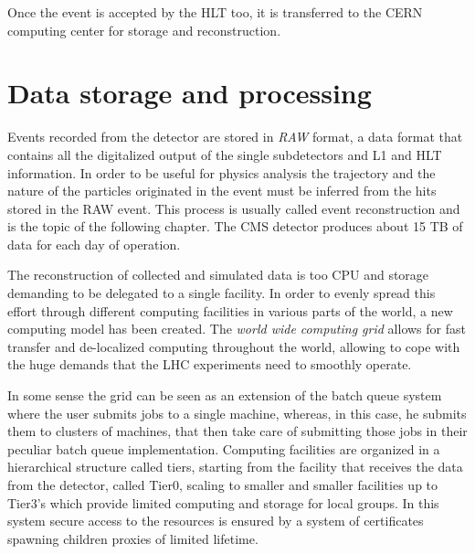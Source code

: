 Once the event is accepted by the HLT too, it is transferred to the CERN computing center for storage and reconstruction.

\section{Data storage and processing}

Events recorded from the detector are stored in \emph{RAW} format, a data format that contains all the digitalized output of the single subdetectors and L1 and HLT information. In order to be useful for physics analysis the trajectory and the nature of the particles originated in the event must be inferred from the hits stored in the RAW event. This process is usually called event reconstruction and is the topic of the following chapter. The CMS detector produces about 15 TB of data for each day of operation.

The reconstruction of collected and simulated data is too CPU and storage demanding to be delegated to a single facility. In order to evenly spread this effort through different computing facilities in various parts of the world, a new computing model has been created. The \emph{world wide computing grid} \cite{Malecki:2005gn} allows for fast transfer and de-localized computing throughout the world, allowing to cope with the huge demands that the LHC experiments need to smoothly operate. 

In some sense the grid can be seen as an extension of the batch queue system where the user submits jobs to a single machine, whereas, in this case, he submits them to clusters of machines, that then take care of submitting those jobs in their peculiar batch queue implementation. Computing facilities are organized in a hierarchical structure called tiers, starting from the facility that receives the data from the detector, called Tier0, scaling to smaller and smaller facilities up to Tier3's which provide limited computing and storage for local groups. In this system secure access to the resources is ensured by a system of certificates spawning children proxies of limited lifetime.

